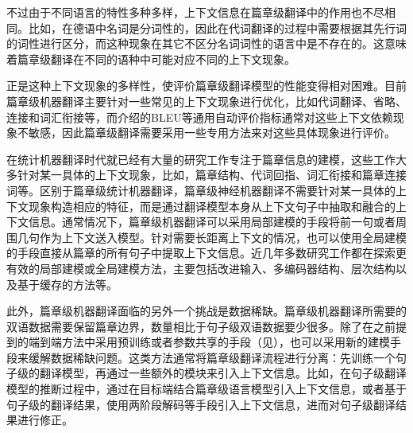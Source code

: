 \parinterval  不过由于不同语言的特性多种多样，上下文信息在篇章级翻译中的作用也不尽相同。比如，在德语中名词是分词性的，因此在代词翻译的过程中需要根据其先行词的词性进行区分，而这种现象在其它不区分名词词性的语言中是不存在的。这意味着篇章级翻译在不同的语种中可能对应不同的上下文现象。

\parinterval 正是这种上下文现象的多样性，使评价篇章级翻译模型的性能变得相对困难。目前篇章级机器翻译主要针对一些常见的上下文现象进行优化，比如代词翻译、省略、连接和词汇衔接等，而{\chapterfour}介绍的BLEU等通用自动评价指标通常对这些上下文依赖现象不敏感，因此篇章级翻译需要采用一些专用方法来对这些具体现象进行评价。

\parinterval 在统计机器翻译时代就已经有大量的研究工作专注于篇章信息的建模，这些工作大多针对某一具体的上下文现象，比如，篇章结构、代词回指、词汇衔接和篇章连接词等。区别于篇章级统计机器翻译，篇章级神经机器翻译不需要针对某一具体的上下文现象构造相应的特征，而是通过翻译模型本身从上下文句子中抽取和融合的上下文信息。通常情况下，篇章级机器翻译可以采用局部建模的手段将前一句或者周围几句作为上下文送入模型。针对需要长距离上下文的情况，也可以使用全局建模的手段直接从篇章的所有句子中提取上下文信息。近几年多数研究工作都在探索更有效的局部建模或全局建模方法，主要包括改进输入、多编码器结构、层次结构以及基于缓存的方法等。

\parinterval 此外，篇章级机器翻译面临的另外一个挑战是数据稀缺。篇章级机器翻译所需要的双语数据需要保留篇章边界，数量相比于句子级双语数据要少很多。除了在之前提到的端到端方法中采用预训练或者参数共享的手段（见{\chaptersixteen}），也可以采用新的建模手段来缓解数据稀缺问题。这类方法通常将篇章级翻译流程进行分离：先训练一个句子级的翻译模型，再通过一些额外的模块来引入上下文信息。比如，在句子级翻译模型的推断过程中，通过在目标端结合篇章级语言模型引入上下文信息，或者基于句子级的翻译结果，使用两阶段解码等手段引入上下文信息，进而对句子级翻译结果进行修正。

